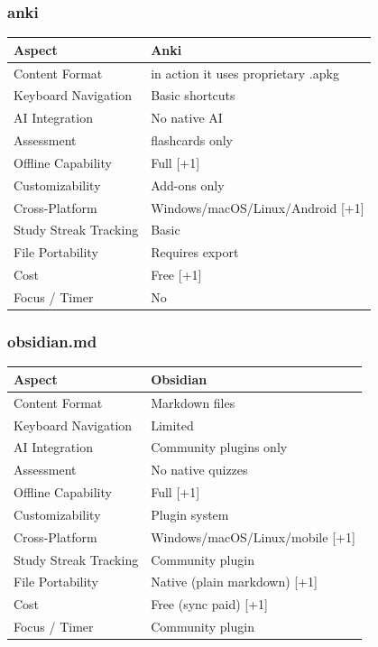 \documentclass[14pt]{article}
\begin{document}
\subsubsection{anki}
\label{sec:orge198f5a}
\begin{center}
\begin{tabular}{ll}
Aspect & Anki\\
\hline
Content Format & in action it uses proprietary .apkg\\
Keyboard Navigation & Basic shortcuts\\
AI Integration & No native AI\\
Assessment & flashcards only\\
Offline Capability & Full [+1]\\
Customizability & Add-ons only\\
Cross-Platform & Windows/macOS/Linux/Android [+1]\\
Study Streak Tracking & Basic\\
File Portability & Requires export\\
Cost & Free [+1]\\
Focus / Timer & No\\
\end{tabular}
\end{center}
\subsubsection{obsidian.md}
\label{sec:org8fc91d3}
\begin{center}
\begin{tabular}{ll}
Aspect & Obsidian\\
\hline
Content Format & Markdown files\\
Keyboard Navigation & Limited\\
AI Integration & Community plugins only\\
Assessment & No native quizzes\\
Offline Capability & Full [+1]\\
Customizability & Plugin system\\
Cross-Platform & Windows/macOS/Linux/mobile [+1]\\
Study Streak Tracking & Community plugin\\
File Portability & Native (plain markdown) [+1]\\
Cost & Free (sync paid) [+1]\\
Focus / Timer & Community plugin\\
\end{tabular}
\end{center}
\end{document}
